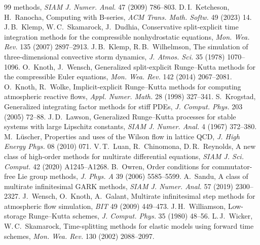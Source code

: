 \documentclass[11pt,a4paper]{article}
\theoremstyle{definition}
\theoremstyle{remark}
\begin{document}
\begin{thebibliography}{99}
 methods, \emph{SIAM J. Numer. Anal.} 47 (2009) 786--803.
 D.\,I.~Ketcheson, H.~Ranocha, Computing with B-series, \emph{ACM Trans. Math. Softw.} 49
 (2023) 14.
 J.\,B.~Klemp, W.\,C.~Skamarock, J.~Dudhia, Conservative split-explicit time
 integration methods for the compressible nonhydrostatic equations, \emph{Mon. Wea. Rev.} 135 (2007) 2897--2913.
 J.\,B.~Klemp, R.\,B.~Wilhelmson, The simulation of three-dimensional convective storm
 dynamics, \emph{J. Atmos. Sci.} 35 (1978) 1070--1096.
 O.~Knoth, J.~Wensch, Generalized split-explicit Runge--Kutta methods for the compressible
 Euler equations, \emph{Mon. Wea. Rev.} 142 (2014) 2067--2081.
 O.~Knoth, R.~Wolke, Implicit-explicit Runge--Kutta methods for computing atmospheric reactive
 flows, \emph{Appl. Numer. Math.} 28 (1998) 327--341.
 S.~Krogstad, Generalized integrating factor methods for stiff PDEs, \emph{J. Comput. Phys.} 203
 (2005) 72--88.
 J.\,D.~Lawson, Generalized Runge--Kutta processes for stable systems with large Lipschitz
 constants, \emph{SIAM J. Numer. Anal.} 4 (1967) 372--380.
 M.~L\"uscher, Properties and uses of the Wilson flow in lattice QCD, \emph{J. High Energy
 Phys.} 08 (2010) 071.
 V.\,T.~Luan, R.~Chinomona, D.\,R.~Reynolds, A new class of high-order methods for
 multirate differential equations, \emph{SIAM J. Sci. Comput.} 42 (2020) A1245--A1268.
 B.~Owren, Order conditions for commutator-free Lie group methods, \emph{J. Phys. A} 39 (2006)
 5585--5599.
 A.~Sandu, A class of multirate infinitesimal GARK methods, \emph{SIAM J. Numer. Anal.} 57 (2019)
 2300--2327.
 J.~Wensch, O.~Knoth, A.~Galant, Multirate infinitesimal step methods for atmospheric
 flow simulation, \emph{BIT} 49 (2009) 449--473.
 J.\,H.~Williamson, Low-storage Runge--Kutta schemes, \emph{J. Comput. Phys.} 35 (1980) 48--56.
 L.\,J.~Wicker, W.\,C.~Skamarock, Time-splitting methods for elastic models using forward
 time schemes, \emph{Mon. Wea. Rev.} 130 (2002) 2088--2097.
\end{thebibliography}
\end{document}
